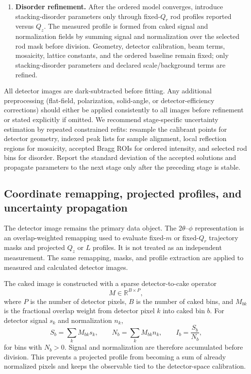 \documentclass[11pt]{article}
\begin{document}
\begin{enumerate}
  \item \textbf{Disorder refinement.}
  After the ordered model converges, introduce stacking-disorder parameters only through fixed-$Q_r$ rod profiles reported versus $Q_z$. The measured profile is formed from caked signal and normalization fields by summing signal and normalization over the selected rod mask before division. Geometry, detector calibration, beam terms, mosaicity, lattice constants, and the ordered baseline remain fixed; only stacking-disorder parameters and declared scale/background terms are refined.
\end{enumerate}

All detector images are dark-subtracted before fitting. Any additional preprocessing (flat-field, polarization, solid-angle, or detector-efficiency corrections) should either be applied consistently to all images before refinement or stated explicitly if omitted. We recommend stage-specific uncertainty estimation by repeated constrained refits: resample the calibrant points for detector geometry, indexed peak lists for sample alignment, local reflection regions for mosaicity, accepted Bragg ROIs for ordered intensity, and selected rod bins for disorder. Report the standard deviation of the accepted solutions and propagate parameters to the next stage only after the preceding stage is stable.


\subsection{Coordinate remapping, projected profiles, and uncertainty propagation}
\label{subsec:si_projection_uncertainty}

The detector image remains the primary data object. The $2\theta$--$\phi$ representation is an overlap-weighted remapping used to evaluate fixed-$m$ or fixed-$Q_r$ trajectory masks and projected $Q_z$ or $L$ profiles. It is not treated as an independent measurement. The same remapping, masks, and profile extraction are applied to measured and calculated detector images.

The caked image is constructed with a sparse detector-to-cake operator
\begin{equation}
M\in \mathbb{R}^{B\times P},
\end{equation}
where $P$ is the number of detector pixels, $B$ is the number of caked bins, and $M_{bk}$ is the fractional overlap weight from detector pixel $k$ into caked bin $b$. For detector signal $s_k$ and normalization $n_k$,
\begin{equation}
S_b=\sum_k M_{bk}s_k,
\qquad
N_b=\sum_k M_{bk}n_k,
\qquad
I_b=\frac{S_b}{N_b},
\end{equation}
for bins with $N_b>0$. Signal and normalization are therefore accumulated before division. This prevents a projected profile from becoming a sum of already normalized pixels and keeps the observable tied to the detector-space calibration.
\end{document}
